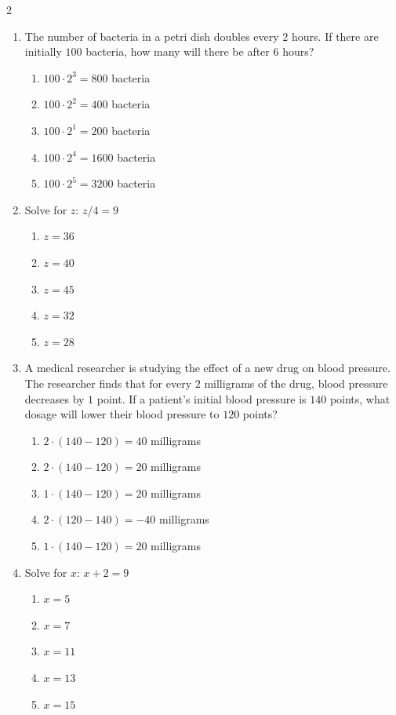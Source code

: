 \documentclass[10pt]{article}
\begin{document}
\begin{multicols}{2}
\begin{enumerate}[label=\textbf{Q\arabic*.}, leftmargin=*, itemsep=6pt, parsep=0pt]
  \item \small The number of bacteria in a petri dish doubles every $2$ hours. If there are initially $100$ bacteria, how many will there be after $6$ hours?
  \begin{enumerate}[label=(\Alph*), leftmargin=0.6cm, nosep, itemsep=2pt]
    \item $100 \cdot 2^3 = 800$ bacteria
    \item $100 \cdot 2^2 = 400$ bacteria
    \item $100 \cdot 2^1 = 200$ bacteria
    \item $100 \cdot 2^4 = 1600$ bacteria
    \item $100 \cdot 2^5 = 3200$ bacteria
  \end{enumerate}

  \item \small Solve for $z$: $z/4 = 9$
  \begin{enumerate}[label=(\Alph*), leftmargin=0.6cm, nosep, itemsep=2pt]
    \item $z = 36$
    \item $z = 40$
    \item $z = 45$
    \item $z = 32$
    \item $z = 28$
  \end{enumerate}

  \item \small A medical researcher is studying the effect of a new drug on blood pressure. The researcher finds that for every $2$ milligrams of the drug, blood pressure decreases by $1$ point. If a patient's initial blood pressure is $140$ points, what dosage will lower their blood pressure to $120$ points?
  \begin{enumerate}[label=(\Alph*), leftmargin=0.6cm, nosep, itemsep=2pt]
    \item $2 \cdot (140 - 120) = 40$ milligrams
    \item $2 \cdot (140 - 120) = 20$ milligrams
    \item $1 \cdot (140 - 120) = 20$ milligrams
    \item $2 \cdot (120 - 140) = -40$ milligrams
    \item $1 \cdot (140 - 120) = 20$ milligrams
  \end{enumerate}

  \item \small Solve for $x$: $x + 2 = 9$
  \begin{enumerate}[label=(\Alph*), leftmargin=0.6cm, nosep, itemsep=2pt]
    \item $x = 5$
    \item $x = 7$
    \item $x = 11$
    \item $x = 13$
    \item $x = 15$
  \end{enumerate}


\end{enumerate}
\end{multicols}
\end{document}
